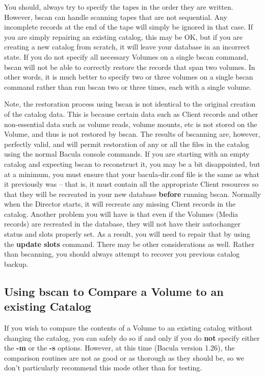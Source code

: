 You should, always try to specify the tapes in the order they are written.
However, bscan can handle scanning tapes that are not sequential.  Any
incomplete records at the end of the tape will simply be ignored in that
case.  If you are simply repairing an existing catalog, this may be OK, but
if you are creating a new catalog from scratch, it will leave your database
in an incorrect state.  If you do not specify all necessary Volumes on a
single bscan command, bscan will not be able to correctly restore the
records that span two volumes.  In other words, it is much better to
specify two or three volumes on a single bscan command rather than run
bscan two or three times, each with a single volume.


Note, the restoration process using bscan is not identical to the original
creation of the catalog data. This is because certain data such as Client
records and other non-essential data such
as volume reads, volume mounts, etc is not stored on the Volume, and thus is
not restored by bscan. The results of bscanning are, however, perfectly valid,
and will permit restoration of any or all the files in the catalog using the
normal Bacula console commands.  If you are starting with an empty catalog
and expecting bscan to reconstruct it, you may be a bit disappointed, but
at a minimum, you must ensure that your bacula-dir.conf file is the same
as what it previously was -- that is, it must contain all the appropriate
Client resources so that they will be recreated in your new database {\bf
before} running bscan. Normally when the Director starts, it will recreate
any missing Client records in the catalog.  Another problem you will have
is that even if the Volumes (Media records) are recreated in the database,
they will not have their autochanger status and slots properly set. As a
result, you will need to repair that by using the {\bf update slots}
command.  There may be other considerations as well.  Rather than
bscanning, you should always attempt to recover you previous catalog
backup.


\subsection{Using bscan to Compare a Volume to an existing Catalog}

If you wish to compare the contents of a Volume to an existing catalog without
changing the catalog, you can safely do so if and only if you do {\bf not}
specify either the {\bf -m} or the {\bf -s} options. However, at this time
(Bacula version 1.26), the comparison routines are not as good or as thorough
as they should be, so we don't particularly recommend this mode other than for
testing. 

